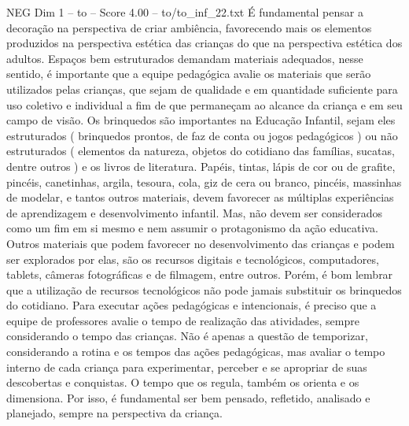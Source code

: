\begin{textsample}{NEG Dim 1 – to – Score 4.00 – to/to\_inf\_22.txt}
É fundamental pensar a decoração na perspectiva de criar ambiência, favorecendo mais os elementos produzidos na perspectiva estética das crianças do que na perspectiva estética dos adultos.
Espaços bem estruturados demandam materiais adequados, nesse sentido, é importante que a equipe pedagógica avalie os materiais que serão utilizados pelas crianças, que sejam de qualidade e em quantidade suficiente para uso coletivo e individual a fim de que permaneçam ao alcance da criança e em seu campo de visão.
Os brinquedos são importantes na Educação Infantil, sejam eles estruturados ( brinquedos prontos, de faz de conta ou jogos pedagógicos ) ou não estruturados ( elementos da natureza, objetos do cotidiano das famílias, sucatas, dentre outros ) e os livros de literatura.
Papéis, tintas, lápis de cor ou de grafite, pincéis, canetinhas, argila, tesoura, cola, giz de cera ou branco, pincéis, massinhas de modelar, e tantos outros materiais, devem favorecer as múltiplas experiências de aprendizagem e desenvolvimento infantil.
Mas, não devem ser considerados como um fim em si mesmo e nem assumir o protagonismo da ação educativa.
Outros materiais que podem favorecer no desenvolvimento das crianças e podem ser explorados por elas, são os recursos digitais e tecnológicos, computadores, tablets, câmeras fotográficas e de filmagem, entre outros.
Porém, é bom lembrar que a utilização de recursos tecnológicos não pode jamais substituir os brinquedos do cotidiano.
Para executar ações pedagógicas e intencionais, é preciso que a equipe de professores avalie o tempo de realização das atividades, sempre considerando o tempo das crianças.
Não é apenas a questão de temporizar, considerando a rotina e os tempos das ações pedagógicas, mas avaliar o tempo interno de cada criança para experimentar, perceber e se apropriar de suas descobertas e conquistas.
O tempo que os regula, também os orienta e os dimensiona.
Por isso, é fundamental ser bem pensado, refletido, analisado e planejado, sempre na perspectiva da criança.

\end{textsample}
